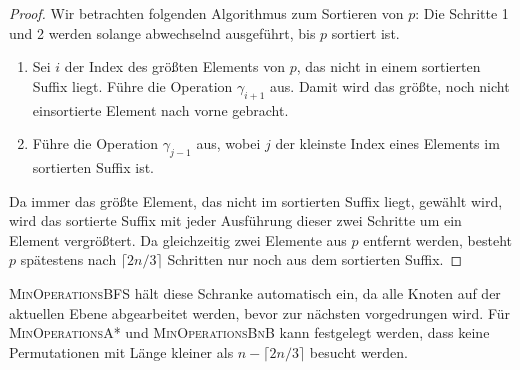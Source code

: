 \documentclass[a4paper, 10pt, ngerman]{article}
\begin{document}
\begin{proof}
    Wir betrachten folgenden Algorithmus zum Sortieren von $p$: Die Schritte 1 und 2 werden solange abwechselnd ausgeführt, bis $p$ sortiert ist.
    \begin{enumerate}
        \item Sei $i$ der Index des größten Elements von $p$, das nicht in einem sortierten Suffix liegt. Führe die Operation $\gamma_{i+1}$ aus. Damit wird das größte, noch nicht einsortierte Element nach vorne gebracht.
        \item Führe die Operation $\gamma_{j-1}$ aus, wobei $j$ der kleinste Index eines Elements im sortierten Suffix ist.
    \end{enumerate}
    Da immer das größte Element, das nicht im sortierten Suffix liegt, gewählt wird, wird das sortierte Suffix mit jeder Ausführung dieser zwei Schritte um ein Element vergrößtert. Da gleichzeitig zwei Elemente aus $p$ entfernt werden, besteht $p$ spätestens nach $\lceil 2n / 3 \rceil$ Schritten nur noch aus dem sortierten Suffix.
\end{proof}

\textsc{MinOperationsBFS} hält diese Schranke automatisch ein, da alle Knoten auf der aktuellen Ebene abgearbeitet werden, bevor zur nächsten vorgedrungen wird. Für \textsc{MinOperationsA*} und \textsc{MinOperationsBnB} kann festgelegt werden, dass keine Permutationen mit Länge kleiner als $n - \lceil 2n / 3 \rceil$ besucht werden.
\end{document}
